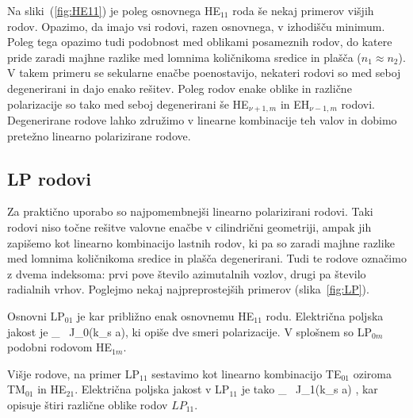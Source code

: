 Na sliki~(\ref{fig:HE11}) je poleg osnovnega HE$_{11}$ roda še nekaj primerov višjih rodov. Opazimo, 
da imajo vsi rodovi, razen osnovnega, v izhodišču minimum. Poleg tega opazimo tudi podobnost med 
oblikami posameznih rodov, do katere pride zaradi majhne razlike med lomnima količnikoma sredice in plašča
($n_1 \approx n_2$). V takem primeru se sekularne enačbe poenostavijo, nekateri rodovi so 
med seboj degenerirani in dajo enako rešitev. Poleg rodov enake oblike in različne polarizacije so tako 
med seboj degenerirani še HE$_{\nu+1,m}$ in EH$_{\nu-1,m}$ rodovi. Degenerirane 
rodove lahko združimo v linearne kombinacije teh valov in dobimo pretežno linearno polarizirane 
rodove. 


\subsection*{LP rodovi}
Za praktično uporabo so najpomembnejši linearno polarizirani rodovi. Taki rodovi niso
točne rešitve valovne enačbe v cilindrični geometriji, ampak jih zapišemo kot linearno 
kombinacijo lastnih rodov, ki pa so zaradi majhne razlike med lomnima količnikoma sredice
in plašča degenerirani. Tudi te rodove označimo z dvema indeksoma: prvi pove število azimutalnih
vozlov, drugi pa število radialnih vrhov. Poglejmo nekaj najpreprostejših primerov (slika~\ref{fig:LP}).

Osnovni LP$_{01}$ je kar približno enak osnovnemu HE$_{11}$ rodu. Električna poljska jakost je 
\beq
{}_  \, J_0(k_s a),
\eeq
ki opiše dve smeri polarizacije. V splošnem so LP$_{0m}$ podobni rodovom HE$_{1m}$. 

Višje rodove, na primer LP$_{11}$ sestavimo kot linearno kombinacijo 
TE$_{01}$ oziroma TM$_{01}$ in HE$_{21}$.
Električna poljska jakost v LP$_{11}$ je tako 
\beq
{}_  \, J_1(k_s a)
{ \cos\varphi \brace \sin\varphi},
\eeq
kar opisuje štiri različne oblike rodov $LP_{11}$.

